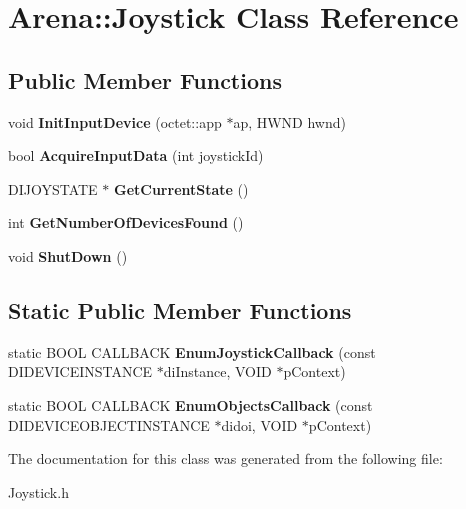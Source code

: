 \hypertarget{class_arena_1_1_joystick}{\section{Arena\+:\+:Joystick Class Reference}
\label{class_arena_1_1_joystick}
}
\subsection*{Public Member Functions}
\begin{DoxyCompactItemize}
\item 
\hypertarget{class_arena_1_1_joystick_a2b34c9b718307296d17888d79c6a63a2}{void {\bfseries Init\+Input\+Device} (octet\+::app $\ast$ap, H\+W\+N\+D hwnd)}\label{class_arena_1_1_joystick_a2b34c9b718307296d17888d79c6a63a2}

\item 
\hypertarget{class_arena_1_1_joystick_aa80acfd9c8fe7b5b797fb9ddb1014233}{bool {\bfseries Acquire\+Input\+Data} (int joystick\+Id)}\label{class_arena_1_1_joystick_aa80acfd9c8fe7b5b797fb9ddb1014233}

\item 
\hypertarget{class_arena_1_1_joystick_ab53e7cf8f1c8ff2da6721cb310d065db}{D\+I\+J\+O\+Y\+S\+T\+A\+T\+E $\ast$ {\bfseries Get\+Current\+State} ()}\label{class_arena_1_1_joystick_ab53e7cf8f1c8ff2da6721cb310d065db}

\item 
\hypertarget{class_arena_1_1_joystick_a44c00037b16a76ea6792e8ffa1a6acf3}{int {\bfseries Get\+Number\+Of\+Devices\+Found} ()}\label{class_arena_1_1_joystick_a44c00037b16a76ea6792e8ffa1a6acf3}

\item 
\hypertarget{class_arena_1_1_joystick_a9a1bf681cc1536b8e9cce2eaff1f2fdc}{void {\bfseries Shut\+Down} ()}\label{class_arena_1_1_joystick_a9a1bf681cc1536b8e9cce2eaff1f2fdc}

\end{DoxyCompactItemize}
\subsection*{Static Public Member Functions}
\begin{DoxyCompactItemize}
\item 
\hypertarget{class_arena_1_1_joystick_a05ac70831fc1089bfbfbb4b3466d3cec}{static B\+O\+O\+L C\+A\+L\+L\+B\+A\+C\+K {\bfseries Enum\+Joystick\+Callback} (const D\+I\+D\+E\+V\+I\+C\+E\+I\+N\+S\+T\+A\+N\+C\+E $\ast$di\+Instance, V\+O\+I\+D $\ast$p\+Context)}\label{class_arena_1_1_joystick_a05ac70831fc1089bfbfbb4b3466d3cec}

\item 
\hypertarget{class_arena_1_1_joystick_a522578f4e7265eb83bd75ce01039c651}{static B\+O\+O\+L C\+A\+L\+L\+B\+A\+C\+K {\bfseries Enum\+Objects\+Callback} (const D\+I\+D\+E\+V\+I\+C\+E\+O\+B\+J\+E\+C\+T\+I\+N\+S\+T\+A\+N\+C\+E $\ast$didoi, V\+O\+I\+D $\ast$p\+Context)}\label{class_arena_1_1_joystick_a522578f4e7265eb83bd75ce01039c651}

\end{DoxyCompactItemize}


The documentation for this class was generated from the following file\+:\begin{DoxyCompactItemize}
\item 
Joystick.\+h\end{DoxyCompactItemize}
